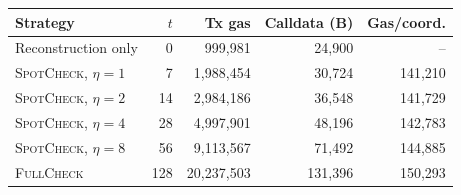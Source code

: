 \begin{tabular}{lrrrr}
\toprule
Strategy & $t$ & Tx gas & Calldata (B) & Gas/coord. \\
\midrule
Reconstruction only & 0 & 999{,}981 & 24{,}900 & -- \\
\textsc{SpotCheck}, $\eta{=}1$ & 7 & 1{,}988{,}454 & 30{,}724 & 141{,}210 \\
\textsc{SpotCheck}, $\eta{=}2$ & 14 & 2{,}984{,}186 & 36{,}548 & 141{,}729 \\
\textsc{SpotCheck}, $\eta{=}4$ & 28 & 4{,}997{,}901 & 48{,}196 & 142{,}783 \\
\textsc{SpotCheck}, $\eta{=}8$ & 56 & 9{,}113{,}567 & 71{,}492 & 144{,}885 \\
\textsc{FullCheck} & 128 & 20{,}237{,}503 & 131{,}396 & 150{,}293 \\
\bottomrule
\end{tabular}
